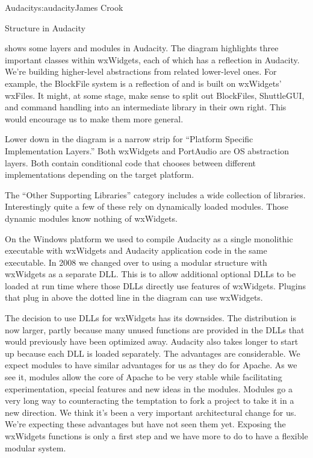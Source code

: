 \begin{aosachapter}{Audacity}{s:audacity}{James Crook}
\begin{aosasect1}{Structure in Audacity}

 shows some layers and modules in Audacity.  The
diagram highlights three important classes within wxWidgets, each of
which has a reflection in Audacity.  We're building higher-level
abstractions from related lower-level ones.  For example, the
BlockFile system is a reflection of and is built on wxWidgets'
wxFiles.  It might, at some stage, make sense to split out BlockFiles,
ShuttleGUI, and command handling into an intermediate library in their
own right.  This would encourage us to make them more general.

Lower down in the diagram is a narrow strip for ``Platform Specific
Implementation Layers.'' Both wxWidgets and PortAudio are OS
abstraction layers.  Both contain conditional code that chooses
between different implementations depending on the target platform.

The ``Other Supporting Libraries'' category includes a wide collection
of libraries.  Interestingly quite a few of these rely on dynamically
loaded modules.  Those dynamic modules know nothing of wxWidgets.

On the Windows platform we used to compile Audacity as a single
monolithic executable with wxWidgets and Audacity application code in
the same executable.  In 2008 we changed over to using a modular
structure with wxWidgets as a separate DLL\@.  This is to allow
additional optional DLLs to be loaded at run time where those DLLs
directly use features of wxWidgets.  Plugins that plug in above the
dotted line in the diagram can use wxWidgets.

The decision to use DLLs for wxWidgets has its downsides.  The
distribution is now larger, partly because many unused functions are
provided in the DLLs that would previously have been optimized away.
Audacity also takes longer to start up because each DLL is loaded
separately.  The advantages are considerable.  We expect modules
to have similar advantages for us as they do for Apache.  As we see
it, modules allow the core of Apache to be very stable while
facilitating experimentation, special features and new ideas in the
modules.  Modules go a very long way to counteracting the temptation
to fork a project to take it in a new direction.  We think it's been a
very important architectural change for us.  We're expecting these
advantages but have not seen them yet.  Exposing the wxWidgets
functions is only a first step and we have more to do to have a
flexible modular system.


\end{aosasect1}
\end{aosachapter}
